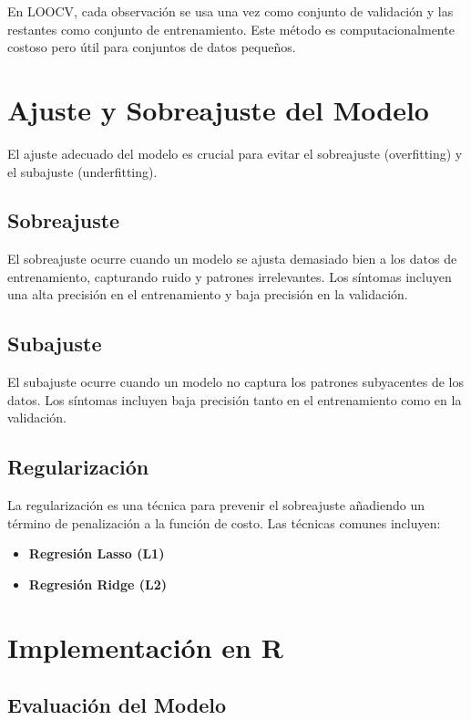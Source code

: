 \documentclass[a4paper]{report} %
\begin{document}
En LOOCV, cada observación se usa una vez como conjunto de validación y las restantes como conjunto de entrenamiento. Este método es computacionalmente costoso pero útil para conjuntos de datos pequeños.

\section{Ajuste y Sobreajuste del Modelo}

El ajuste adecuado del modelo es crucial para evitar el sobreajuste (overfitting) y el subajuste (underfitting).

\subsection{Sobreajuste}

El sobreajuste ocurre cuando un modelo se ajusta demasiado bien a los datos de entrenamiento, capturando ruido y patrones irrelevantes. Los síntomas incluyen una alta precisión en el entrenamiento y baja precisión en la validación.

\subsection{Subajuste}

El subajuste ocurre cuando un modelo no captura los patrones subyacentes de los datos. Los síntomas incluyen baja precisión tanto en el entrenamiento como en la validación.

\subsection{Regularización}

La regularización es una técnica para prevenir el sobreajuste añadiendo un término de penalización a la función de costo. Las técnicas comunes incluyen:
\begin{itemize}
    \item \textbf{Regresión Lasso (L1)}
    \item \textbf{Regresión Ridge (L2)}
\end{itemize}

\section{Implementación en R}

\subsection{Evaluación del Modelo}
\end{document}
